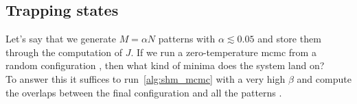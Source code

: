 \documentclass[\rootdir/main.tex]{subfiles}
\begin{document}
\subsection{Trapping states}
Let's say that we generate $M = \alpha N$ patterns with $\alpha \lesssim 0.05$ and store them through the computation of $J$. If we run a zero-temperature \acrlong{mcmc} from a random configuration \bsigma, then what kind of minima does the system land on?\\
To answer this it suffices to run~\cref{alg:shm_mcmc} with a very high $\beta$ and compute the overlaps between the final configuration and all the patterns \bxi.

\subbibliography
\end{document}
